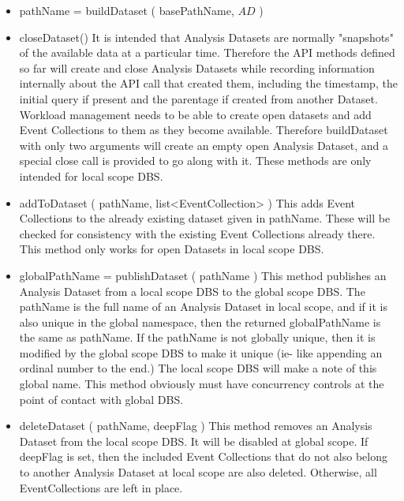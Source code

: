 \documentclass{cmspaper}
\begin{document}
\begin{itemize}
\item  pathName = buildDataset ( basePathName, $AD$ )
\item  closeDataset() 
       It is intended that Analysis Datasets are normally "snapshots"
       of the available data at a particular time.  Therefore the API
       methods defined so far will create and close Analysis Datasets
       while recording information internally about the API call that
       created them, including the timestamp, the initial query if
       present and the parentage if created from another Dataset.
       Workload management needs to be able to create open datasets
       and add Event Collections to them as they become available.
       Therefore buildDataset with only two arguments will create an
       empty open Analysis Dataset, and a special close call is provided
       to go along with it.  These methods are only intended for local
       scope DBS.

\item  addToDataset ( pathName, list<EventCollection> )
       This adds Event Collections to the already existing dataset given in 
       pathName.  These will be checked for consistency with the existing 
       Event Collections already there.  This method only works for 
       open Datasets in local scope DBS.
   
\item  globalPathName = publishDataset ( pathName )
      This method publishes an Analysis Dataset from a local scope DBS
      to the global scope DBS.  The pathName is the full name of an
      Analysis Dataset in local scope, and if it is also unique in the
      global namespace, then the returned globalPathName is the same
      as pathName.  If the pathName is not globally unique, then it
      is modified by the global scope DBS to make it unique (ie- like
      appending an ordinal number to the end.) The local scope DBS will
      make a note of this global name.  This method obviously must have
      concurrency controls at the point of contact with global DBS.

\item  deleteDataset ( pathName, deepFlag ) 
      This method removes an Analysis Dataset from the local scope DBS.
      It will be disabled at global scope.  If deepFlag is set, then
      the included Event Collections that do not also belong to another
      Analysis Dataset at local scope are also deleted.  Otherwise,
      all EventCollections are left in place.

\end{itemize}
\end{document}
